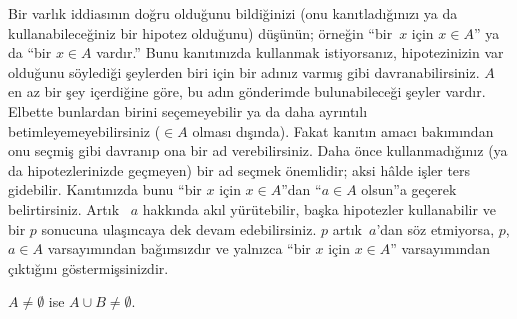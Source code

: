 Bir varlık iddiasının doğru olduğunu bildiğinizi (onu kanıtladığınızı
ya da kullanabileceğiniz bir hipotez olduğunu) düşünün; örneğin
``bir~$x$ için $x \in A$'' ya da ``bir $x \in A$ vardır.'' Bunu
kanıtınızda kullanmak istiyorsanız, hipotezinizin var olduğunu söylediği
şeylerden biri için bir adınız varmış gibi davranabilirsiniz. $A$ en az
bir şey içerdiğine göre, bu adın gönderimde bulunabileceği şeyler
vardır. Elbette bunlardan birini seçemeyebilir ya da daha ayrıntılı
betimleyemeyebilirsiniz ($\in A$ olması dışında). Fakat kanıtın amacı
bakımından onu seçmiş gibi davranıp ona bir ad verebilirsiniz. Daha önce
kullanmadığınız (ya da hipotezlerinizde geçmeyen) bir ad seçmek
önemlidir; aksi hâlde işler ters gidebilir. Kanıtınızda bunu ``bir $x$
için $x \in A$''dan ``$a \in A$ olsun''a geçerek belirtirsiniz. Artık
~$a$ hakkında akıl yürütebilir, başka hipotezler kullanabilir ve bir $p$
sonucuna ulaşıncaya dek devam edebilirsiniz. $p$ artık~$a$'dan söz
etmiyorsa, $p$, $a \in A$ varsayımından bağımsızdır ve yalnızca ``bir
$x$ için $x \in A$'' varsayımından çıktığını göstermişsinizdir.

\begin{prop}
$A \neq \emptyset$ ise $A \cup B \neq \emptyset$.
\end{prop}


